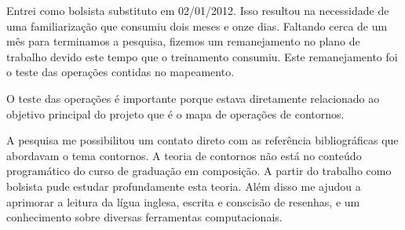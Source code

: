 \documentclass[11pt]{article}
\begin{document}
Entrei como bolsista substituto em 02/01/2012. Isso resultou na
necessidade de uma familiarização que consumiu dois meses e onze dias.
Faltando cerca de um mês para terminamos a pesquisa, fizemos um
remanejamento no plano de trabalho devido este tempo que o treinamento
consumiu. Este remanejamento foi o teste das operações contidas no
mapeamento.

O teste das operações é importante porque estava diretamente
relacionado ao objetivo principal do projeto que é o mapa de operações
de contornos.

A pesquisa me possibilitou um contato direto com as referência
bibliográficas que abordavam o tema contornos.  A teoria de contornos
não está no conteúdo programático do curso de graduação em composição.
A partir do trabalho como bolsista pude estudar profundamente esta
teoria.  Além disso me ajudou a aprimorar a leitura da lígua inglesa,
escrita e conscisão de resenhas, e um conhecimento sobre diversas
ferramentas computacionais.



\renewcommand{\refname}{Referências bibliográficas (máximo 15)}

\nocite{
  Friedmann1985,
  Friedmann1987,
  Morris1987,
  Marvin1987,
  Marvin1988,
  Polansky1992,
  Morris1993,
  Clifford1995,
  Quinn1997,
  Beard2003,
  Sampaio2008,
  Schultz2008,
  Schultz2009,
  Bor2009
}





\end{document}
